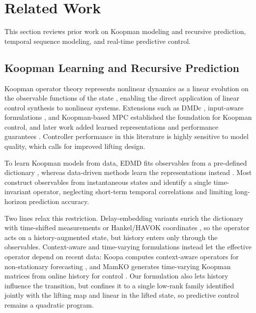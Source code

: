 \section{Related Work}
\label{sec:related_work}

This section reviews prior work on Koopman modeling and recursive prediction, temporal sequence modeling, and real-time predictive control.

\subsection{Koopman Learning and Recursive Prediction}

Koopman operator theory represents nonlinear dynamics as a linear evolution on the observable functions of the state \cite{koopman1931hamiltonian, koopman1932spectra, mezic2005spectral}, enabling the direct application of linear control synthesis to nonlinear systems. Extensions such as DMDc \cite{proctor2016dmdc}, input-aware formulations \cite{proctor2018generalizing, brunton2016invariant}, and Koopman-based MPC \cite{korda2018linear} established the foundation for Koopman control, and later work added learned representations and performance guarantees \cite{han2020deep, shi2022deep, strasser2026overview, duran2025control}. Controller performance in this literature is highly sensitive to model quality, which calls for improved lifting design.

To learn Koopman models from data, EDMD fits observables from a pre-defined dictionary \cite{williams2015data, williams2015kernel, klus2018data}, whereas data-driven methods learn the representations instead \cite{takeishi2017koopman, lusch2018deep, yeung2019learning, morton2019deep, yuan2022variational}. Most construct observables from instantaneous states and identify a single time-invariant operator, neglecting short-term temporal correlations and limiting long-horizon prediction accuracy.

Two lines relax this restriction. Delay-embedding variants enrich the dictionary with time-shifted measurements or Hankel/HAVOK coordinates \cite{kamb2020timedelay, brunton2017chaos, arbabi2017ergodic, das2019delay}, so the operator acts on a history-augmented state, but history enters only through the observables. Context-aware and time-varying formulations instead let the effective operator depend on recent data: Koopa computes context-aware operators for non-stationary forecasting \cite{liu2023koopa}, and MamKO generates time-varying Koopman matrices from online history for control \cite{li2025mamko}. Our formulation also lets history influence the transition, but confines it to a single low-rank family identified jointly with the lifting map and linear in the lifted state, so predictive control remains a quadratic program.

